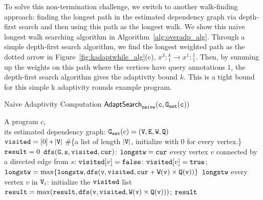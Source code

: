 To solve this non-termination challenge, we switch to another walk-finding approach:
finding the longest path in the estimated dependency graph via depth-first search and then using this path as the longest walk.
We show this naive longest walk searching algorithm in Algorithm~\ref{alg:overadp_alg}.
Through a simple depth-first search algorithm, we find the longest weighted path as the dotted arrow in Figure~\ref{fig:kadaptwhile_alg}(c),
$x^3: {}^k_1 \to x^1: {}^1_1 $.
Then, by summing up the weights on this path where the vertices have query annotations $1$, the depth-first search algorithm gives the adaptivity bound $k$.
This is a tight bound for this simple k adaptivity rounds example program.
\begin{algorithm}
 \caption{
 {Naive Adaptivity Computation {$\mathtt{\mathsf{AdaptSearch}_{naive}(c, \mathtt{{G_{est}}}(c))}$}}
 \label{alg:overadp_alg}
 }
 \begin{algorithmic}[1]
 \REQUIRE A program $c$,
 \\
 its estimated dependency graph: $\mathtt{{G_{est}}}(c) = (\mathtt{V}, \mathtt{E}, \mathtt{W}, \mathtt{Q})$
 \\ $\mathtt{visited} = [0]*|\mathtt{V}|$ \#\{a list of length $|\mathtt{V}|$, initialize with $0$ for every vertex.\}
 \\ $\mathtt{result} = 0$
  {$\mathtt{dfs(G, s, visited, cur)}$}:
 \STATE \qquad $\mathtt{longstw = cur}$
 \STATE {} every vertex $v$ 
 connected by a directed edge from $s$:
 \STATE \qquad {} $\mathtt{visited}[v] = \mathtt{false}$:
 \STATE \qquad \qquad \qquad $\mathtt{visited}[v] = \mathtt{true}$; %
 \STATE \qquad \qquad \qquad $\mathtt{longstw} = \max\{\mathtt{longstw}, \mathtt{dfs(v, visited, cur + \mathtt{W}(v)\times \mathtt{Q}(v))} \}$
 \STATE {} $\mathtt{longstw}$
  every vertex $v$ in $\mathtt{V}_i$:
 \STATE \qquad initialize the $\mathtt{visited}$ list
 \STATE \qquad $\mathtt{result = \max(result, dfs(v, \mathtt{visited}, \mathtt{W}(v)\times \mathtt{Q}(v)))}$; 
 \RETURN $\mathtt{result}$
 \end{algorithmic}
 \end{algorithm}

